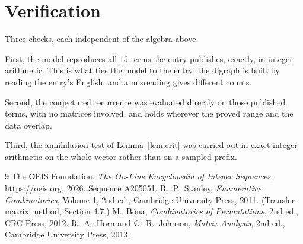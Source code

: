 \documentclass[11pt,a4paper]{article}
\theoremstyle{plain}
\theoremstyle{definition}
\begin{document}
\section{Verification}

Three checks, each independent of the algebra above.

First, the model reproduces all $15$ terms the entry publishes, exactly, in integer
arithmetic. This is what ties the model to the entry: the digraph is built by reading the
entry's English, and a misreading gives different counts.

Second, the conjectured recurrence was evaluated directly on those published terms, with no
matrices involved, and holds wherever the proved range and the data overlap.

Third, the annihilation test of Lemma~\ref{lem:crit} was carried out in exact integer
arithmetic on the whole vector rather than on a sampled prefix.

\begin{thebibliography}{9}
 The OEIS Foundation, \emph{The On-Line Encyclopedia of Integer
Sequences}, \url{https://oeis.org}, 2026. Sequence A205051.
 R.~P.~Stanley, \emph{Enumerative Combinatorics}, Volume 1, 2nd ed.,
Cambridge University Press, 2011. (Transfer-matrix method, Section 4.7.)
 M.~B\'ona, \emph{Combinatorics of Permutations}, 2nd ed., CRC
Press, 2012.
 R.~A.~Horn and C.~R.~Johnson, \emph{Matrix Analysis}, 2nd ed., Cambridge
University Press, 2013.
\end{thebibliography}
\end{document}
